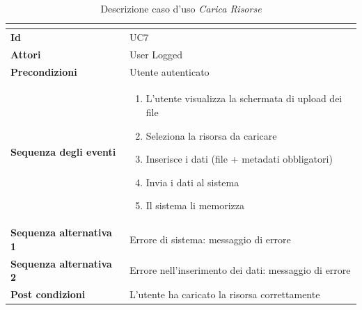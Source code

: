 \documentclass[a4paper]{article}
\begin{document}
\begin{table}[H]
    \centering
    \renewcommand{\arraystretch}{1.5}
    \begin{tabular}{|>{\bfseries}l|p{10cm}|}
        \hline
        \multicolumn{2}{|c|}{\textbf{Caso d'uso: Carica Risorse}} \\
        \hline
        \textbf{Id} & UC7 \\ \hline
        \textbf{Attori} & User Logged \\ \hline
        \textbf{Precondizioni} & Utente autenticato \\ \hline
        \textbf{Sequenza degli eventi} &
        \begin{enumerate}
            \item L'utente visualizza la schermata di upload dei file
            \item Seleziona la risorsa da caricare
            \item Inserisce i dati (file + metadati obbligatori)
            \item Invia i dati al sistema
            \item Il sistema li memorizza
        \end{enumerate}\\ \hline
        \textbf{Sequenza alternativa 1} & Errore di sistema: messaggio di errore \\ \hline
        \textbf{Sequenza alternativa 2} & Errore nell'inserimento dei dati: messaggio di errore \\ \hline
        \textbf{Post condizioni} & L'utente ha caricato la risorsa correttamente \\ \hline
    \end{tabular}
    \caption{Descrizione caso d'uso \textit{Carica Risorse}}
    \label{tab:upload_resources-usecase}
\end{table}
\end{document}
